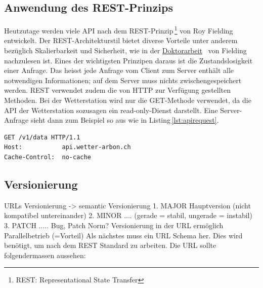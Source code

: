 
\subsection{Anwendung des REST-Prinzips}
Heutzutage werden viele API nach dem REST-Prinzip\,\footnote{REST: Representational State Transfer} von Roy Fielding entwickelt. Der REST-Architekturstil bietet diverse Vorteile unter anderem bezüglich Skalierbarkeit und Sicherheit, wie in der \href{https://www.ics.uci.edu/~fielding/pubs/dissertation/top.htm}{Doktorarbeit}~\cite{Fielding:2000:ASD:932295} von Fielding nachzulesen ist. Eines der wichtigsten Prinzipen daraus ist die Zustandslosigkeit einer Anfrage. Das heisst jede Anfrage vom Client zum Server enthält alle notwendigen Informationen; auf dem Server muss nichts zwischengespeichert werden. REST verwendet zudem die von HTTP zur Verfügung gestellten Methoden\cite{LornaJaneMitchell2013oreilly}. Bei der Wetterstation wird nur die GET-Methode verwendet, da die API der Wetterstation sozusagen ein read-only-Dienst darstellt. Eine Server-Anfrage sieht dann zum Beispiel so aus wie in Listing\,\ref{lst:apirequest}.

\vspace{3mm}
\begin{lstlisting}[label=lst:apirequest,caption=Serveranfrage, language=HTML5, style=php]
GET /v1/data HTTP/1.1
Host:           api.wetter-arbon.ch
Cache-Control:  no-cache
\end{lstlisting}
\vspace{3mm}



\subsection{Versionierung}
URLs
Versionierung -> semantic Versionierung
1. MAJOR Hauptversion (nicht kompatibel untereinander)
2. MINOR .... (gerade = stabil, ungerade = instabil)
3. PATCH ..... Bug, Patch
Norm?
Versionierung in der URL ermöglich Parallelbetrieb (=Vorteil)
Als nächstes muss ein URL Schema her. Dies wird benötigt, um nach dem REST Standard zu arbeiten. Die URL sollte folgendermassen aussehen:



